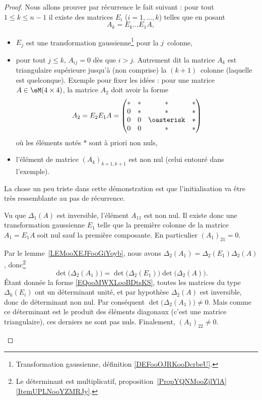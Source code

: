 \begin{proof}
	Nous allons prouver par récurrence le fait suivant : pour tout \( 1\leq k\leq n-1\) il existe des matrices \( E_i\) (\( i=1,\ldots, k\)) telles que en posant
	\begin{equation}
		A_k=E_{k}\ldots E_1A,
	\end{equation}
	\begin{itemize}
		\item \( E_j\) est une transformation gaussienne\footnote{Transformation gaussienne, définition \ref{DEFooOJRKooDcrbeU}.} pour la \( j\)\ieme\ colonne,
		\item pour tout \( j\leq k\), \( A_{ij}=0\) dès que \( i>j\). Autrement dit la matrice \( A_k\) est triangulaire supérieure jusqu'à (non comprise) la \( (k+1)\)\ieme\ colonne (laquelle est quelconque). Exemple pour fixer les idées : pour une matrice \( A\in \eM(4\times 4) \), la matrice \( A_2\) doit avoir la forme
		      \begin{equation}
			      A_2=E_2E_1A=\begin{pmatrix}
				      * & * & *          & * \\
				      0 & * & *          & * \\
				      0 & 0 & \oasterisk & * \\
				      0 & 0 & *          & *
			      \end{pmatrix}
		      \end{equation}
		      où les éléments notés \(*\) sont à priori non nuls,
		\item l'élément de matrice \( (A_k)_{ k+1,k+1  }  \) est non nul (celui entouré dans l'exemple).
	\end{itemize}

	La chose un peu triste dans cette démonstration est que l'initialisation va être très ressemblante au pas de récurrence.
	\begin{subproof}
		\spitem[Initialisation : \( k=1\)]

		Vu que \( \Delta_1(A)\) est inversible, l'élément \( A_{11}\) est non nul. Il existe donc une transformation gaussienne \( E_1\) telle que la première colonne de la matrice \( A_1=E_1A\) soit nul sauf la première composante. En particulier \( (A_1)_{21}=0\).

		Par le lemme~\ref{LEMooXEJFooGiYoyb}, nous avons \( \Delta_2(A_1)=\Delta_2(E_1)\Delta_2(A)\), donc\footnote{Le déterminant est multiplicatif, proposition~\ref{PropYQNMooZjlYlA}\ref{ItemUPLNooYZMRJy}.}
		\begin{equation}
			\det\big( \Delta_2(A_1) \big)=\det\big( \Delta_2(E_1) \big)\det\big( \Delta_2(A) \big).
		\end{equation}
		Étant donnée la forme \eqref{EQooMWXLooBDtsKS}, toutes les matrices du type \( \Delta_k(E_i)\) ont un déterminant unité, et par hypothèse \( \Delta_2(A)\) est inversible, donc de déterminant non nul. Par conséquent \( \det\big( \Delta_2(A_1) \big)\neq 0\). Mais comme ce déterminant est le produit des éléments diagonaux (c'est une matrice triangulaire), ces derniers ne sont pas nuls. Finalement, \( (A_1)_{22}\neq 0\).


\end{subproof}
\end{proof}
